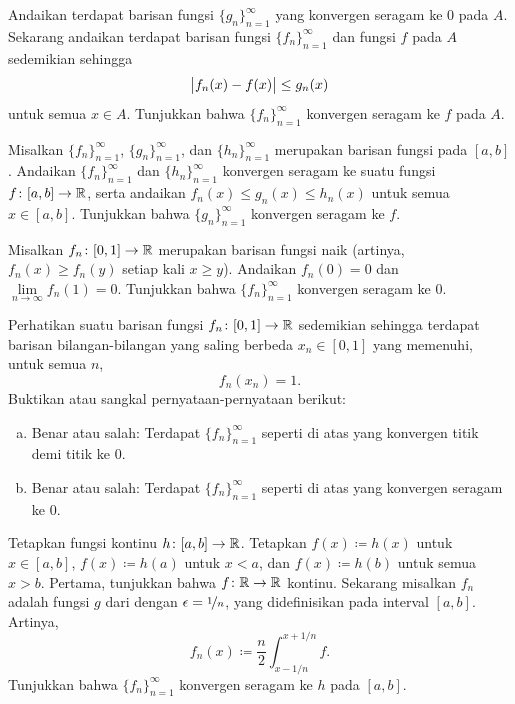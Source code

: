 \begin{exercise}
Andaikan terdapat barisan fungsi $\{ g_n \}_{n=1}^\infty$ yang konvergen
seragam ke $0$ pada $A$.  Sekarang andaikan terdapat barisan fungsi
$\{ f_n \}_{n=1}^\infty$ dan fungsi $f$ pada $A$ sedemikian sehingga
\begin{equation*}
\bigl\lvert {f_n(x) - f(x)} \bigr\rvert \leq g_n(x) 
\end{equation*}
untuk semua $x \in A$.  Tunjukkan bahwa $\{ f_n \}_{n=1}^\infty$ konvergen seragam ke $f$ pada $A$.
\end{exercise}

\begin{exercise}
Misalkan $\{ f_n \}_{n=1}^\infty$, $\{ g_n \}_{n=1}^\infty$, dan
$\{ h_n \}_{n=1}^\infty$ merupakan barisan fungsi pada
$[a,b]$.  Andaikan $\{ f_n \}_{n=1}^\infty$ dan $\{ h_n \}_{n=1}^\infty$ konvergen seragam ke suatu fungsi
$f \colon [a,b] \to {\mathbb{R}}$, serta andaikan $f_n(x) \leq g_n(x) \leq h_n(x)$
untuk semua $x \in [a,b]$.  Tunjukkan bahwa $\{ g_n \}_{n=1}^\infty$ konvergen seragam ke $f$.
\end{exercise}

\begin{exercise}
Misalkan $f_n \colon [0,1] \to {\mathbb{R}}$ merupakan barisan fungsi naik (artinya,
$f_n(x) \geq f_n(y)$ setiap kali $x \geq y$).  Andaikan $f_n(0) = 0$
dan $\lim\limits_{n \to \infty} f_n(1) = 0$.  Tunjukkan bahwa
$\{ f_n \}_{n=1}^\infty$
konvergen seragam ke $0$.
\end{exercise}

\begin{exercise}
Perhatikan suatu barisan fungsi $f_n \colon [0,1] \to {\mathbb{R}}$ sedemikian sehingga
terdapat barisan bilangan-bilangan yang saling berbeda $x_n \in [0,1]$ yang memenuhi,
untuk semua $n$,
\begin{equation*}
f_n(x_n) = 1.
\end{equation*}
Buktikan atau sangkal pernyataan-pernyataan berikut:
\begin{enumerate}[a)]
\item
Benar atau salah: Terdapat $\{ f_n \}_{n=1}^\infty$ seperti di atas yang
konvergen titik demi titik ke $0$.
\item
Benar atau salah: Terdapat $\{ f_n \}_{n=1}^\infty$ seperti di atas yang
konvergen seragam ke $0$.
\end{enumerate}
\end{exercise}

\begin{exercise}
Tetapkan fungsi kontinu $h \colon [a,b] \to {\mathbb{R}}$.
Tetapkan $f(x) \coloneqq h(x)$ untuk $x \in [a,b]$,
$f(x) \coloneqq h(a)$ untuk $x < a$, dan $f(x) \coloneqq h(b)$ untuk semua $x > b$.  Pertama, tunjukkan
bahwa $f \colon {\mathbb{R}} \to {\mathbb{R}}$ kontinu.
Sekarang misalkan $f_n$ adalah
fungsi $g$ dari  dengan
$\epsilon = \nicefrac{1}{n}$, yang didefinisikan pada interval $[a,b]$.  Artinya,
\begin{equation*}
f_n(x) \coloneqq \frac{n}{2} \int_{x-1/n}^{x+1/n} f .
\end{equation*}
Tunjukkan bahwa $\{ f_n \}_{n=1}^\infty$ konvergen seragam ke $h$ pada $[a,b]$.
\end{exercise}


